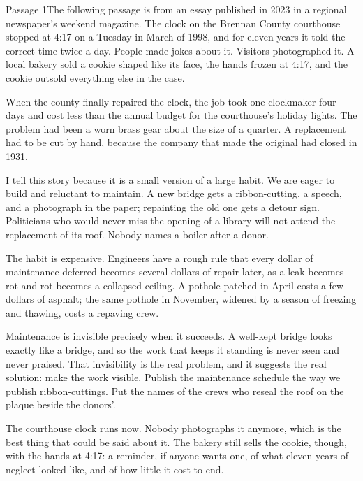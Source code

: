 \documentclass[11pt]{article}
\begin{document}
\begin{passage}{Passage 1}{The following passage is from an essay published in 2023 in a regional newspaper's weekend magazine.}
 The clock on the Brennan County courthouse stopped at 4:17 on a Tuesday in March of 1998, and for eleven years it told the correct time twice a day. People made jokes about it. Visitors photographed it. A local bakery sold a cookie shaped like its face, the hands frozen at 4:17, and the cookie outsold everything else in the case.

 When the county finally repaired the clock, the job took one clockmaker four days and cost less than the annual budget for the courthouse's holiday lights. The problem had been a worn brass gear about the size of a quarter. A replacement had to be cut by hand, because the company that made the original had closed in 1931.

 I tell this story because it is a small version of a large habit. We are eager to build and reluctant to maintain. A new bridge gets a ribbon-cutting, a speech, and a photograph in the paper; repainting the old one gets a detour sign. Politicians who would never miss the opening of a library will not attend the replacement of its roof. Nobody names a boiler after a donor.

 The habit is expensive. Engineers have a rough rule that every dollar of maintenance deferred becomes several dollars of repair later, as a leak becomes rot and rot becomes a collapsed ceiling. A pothole patched in April costs a few dollars of asphalt; the same pothole in November, widened by a season of freezing and thawing, costs a repaving crew.

 Maintenance is invisible precisely when it succeeds. A well-kept bridge looks exactly like a bridge, and so the work that keeps it standing is never seen and never praised. That invisibility is the real problem, and it suggests the real solution: make the work visible. Publish the maintenance schedule the way we publish ribbon-cuttings. Put the names of the crews who reseal the roof on the plaque beside the donors'.

 The courthouse clock runs now. Nobody photographs it anymore, which is the best thing that could be said about it. The bakery still sells the cookie, though, with the hands at 4:17: a reminder, if anyone wants one, of what eleven years of neglect looked like, and of how little it cost to end.
\end{passage}
\end{document}
